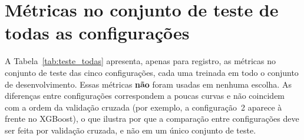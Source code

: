 \section{Métricas no conjunto de teste de todas as configurações}
\label{sec:teste_todas}

A Tabela~\ref{tab:teste_todas} apresenta, apenas para registro, as métricas no conjunto de teste das cinco configurações, cada uma treinada em todo o conjunto de desenvolvimento. Essas métricas \textbf{não} foram usadas em nenhuma escolha. As diferenças entre configurações correspondem a poucas curvas e não coincidem com a ordem da validação cruzada (por exemplo, a configuração~2 aparece à frente no XGBoost), o que ilustra por que a comparação entre configurações deve ser feita por validação cruzada, e não em um único conjunto de teste.

